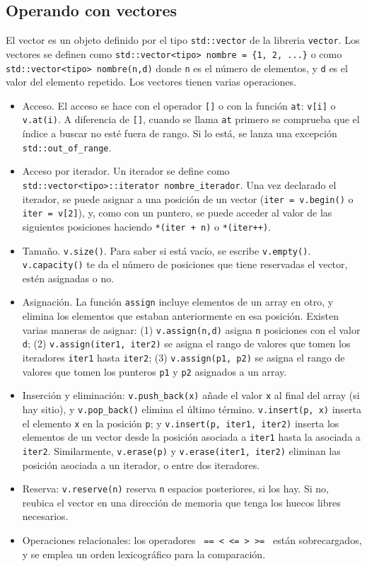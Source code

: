 \documentclass[a4paper]{article}
\begin{document}
	 \subsection{Operando con vectores}
	 El vector es un objeto definido por el tipo \verb|std::vector| de la libreria \verb|vector|. Los vectores se definen como \verb|std::vector<tipo> nombre = {1, 2, ...}| o como \verb|std::vector<tipo> nombre(n,d)| donde \verb|n| es el número de elementos, y \verb|d| es el valor del elemento repetido. Los vectores tienen varias operaciones.
	 
	 \begin{itemize}
	 	\item Acceso. El acceso se hace con el operador \verb|[]| o con la función \verb|at|: \verb|v[i]| o \verb|v.at(i)|. A diferencia de \verb|[]|, cuando se llama \verb|at| primero se comprueba que el índice a buscar no esté fuera de rango. Si lo está, se lanza una excepción \verb|std::out_of_range|.
	 	\item Acceso por iterador. Un iterador se define como \verb|std::vector<tipo>::iterator nombre_iterador|. Una vez declarado el iterador, se puede asignar a una posición de un vector (\verb|iter = v.begin()| o \verb|iter = v[2]|), y, como con un puntero, se puede acceder al valor de las siguientes posiciones haciendo \verb|*(iter + n)| o \verb|*(iter++)|.
	 	\item Tamaño. \verb|v.size()|. Para saber si está vacío, se escribe \verb|v.empty()|. \verb|v.capacity()| te da el número de posiciones que tiene reservadas el vector, estén asignadas o no.
	 	\item Asignación. La función \verb|assign| incluye elementos de un array en otro, y elimina los elementos que estaban anteriormente en esa posición. Existen varias maneras de asignar: (1) \verb|v.assign(n,d)| asigna \verb|n| posiciones con el valor \verb|d|; (2) \verb|v.assign(iter1, iter2)| se asigna el rango de valores que tomen los iteradores \verb|iter1| hasta \verb|iter2|; (3) \verb|v.assign(p1, p2)| se asigna el rango de valores que tomen los punteros \verb|p1| y \verb|p2| asignados a un array.
	 	\item Inserción y eliminación: \verb|v.push_back(x)| añade el valor \verb|x| al final del array (si hay sitio), y \verb|v.pop_back()| elimina el último término. \verb|v.insert(p, x)| inserta el elemento \verb|x| en la posición \verb|p|; y \verb|v.insert(p, iter1, iter2)| inserta los elementos de un vector desde la posición asociada a \verb|iter1| hasta la asociada a \verb|iter2|. Similarmente, \verb|v.erase(p)| y \verb|v.erase(iter1, iter2)| eliminan las posición asociada a un iterador, o entre dos iteradores.
	 	\item Reserva: \verb|v.reserve(n)| reserva \verb|n| espacios posteriores, si los hay. Si no, reubica el vector en una dirección de memoria que tenga los huecos libres necesarios.
	 	\item Operaciones relacionales: los operadores \verb| == < <= > >= | están sobrecargados, y se emplea un orden lexicográfico para la comparación.
	 \end{itemize}
	 
\end{document}
